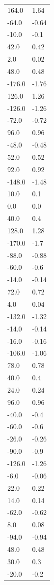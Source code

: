 \begin{longtable}{ll}
164.0 & 1.64 \\
-64.0 & -0.64 \\
-10.0 & -0.1 \\
42.0 & 0.42 \\
2.0 & 0.02 \\
48.0 & 0.48 \\
-176.0 & -1.76 \\
126.0 & 1.26 \\
-126.0 & -1.26 \\
-72.0 & -0.72 \\
96.0 & 0.96 \\
-48.0 & -0.48 \\
52.0 & 0.52 \\
92.0 & 0.92 \\
-148.0 & -1.48 \\
10.0 & 0.1 \\
0.0 & 0.0 \\
40.0 & 0.4 \\
128.0 & 1.28 \\
-170.0 & -1.7 \\
-88.0 & -0.88 \\
-60.0 & -0.6 \\
-14.0 & -0.14 \\
72.0 & 0.72 \\
4.0 & 0.04 \\
-132.0 & -1.32 \\
-14.0 & -0.14 \\
-16.0 & -0.16 \\
-106.0 & -1.06 \\
78.0 & 0.78 \\
40.0 & 0.4 \\
24.0 & 0.24 \\
96.0 & 0.96 \\
-40.0 & -0.4 \\
-60.0 & -0.6 \\
-26.0 & -0.26 \\
-90.0 & -0.9 \\
-126.0 & -1.26 \\
-6.0 & -0.06 \\
22.0 & 0.22 \\
14.0 & 0.14 \\
-62.0 & -0.62 \\
8.0 & 0.08 \\
-94.0 & -0.94 \\
48.0 & 0.48 \\
30.0 & 0.3 \\
-20.0 & -0.2 \\

\end{longtable}
